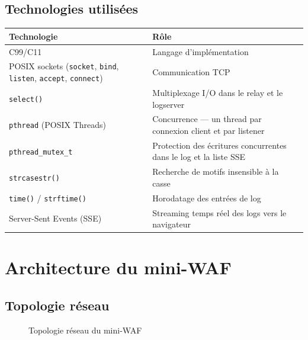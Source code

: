 \documentclass[12pt,a4paper]{article}
\begin{document}
\subsection{Technologies utilisées}

\begin{tabularx}{\linewidth}{lX}
  \toprule
  \textbf{Technologie} & \textbf{Rôle} \\
  \midrule
  C99/C11 & Langage d'implémentation \\
  POSIX sockets (\texttt{socket}, \texttt{bind}, \texttt{listen}, \texttt{accept}, \texttt{connect}) & Communication TCP \\
  \texttt{select()} & Multiplexage I/O dans le relay et le logserver \\
  \texttt{pthread} (POSIX Threads) & Concurrence --- un thread par connexion client et par listener \\
  \texttt{pthread\_mutex\_t} & Protection des écritures concurrentes dans le log et la liste SSE \\
  \texttt{strcasestr()} & Recherche de motifs insensible à la casse \\
  \texttt{time()} / \texttt{strftime()} & Horodatage des entrées de log \\
  Server-Sent Events (SSE) & Streaming temps réel des logs vers le navigateur \\
  \bottomrule
\end{tabularx}

\section{Architecture du mini-WAF}

\subsection{Topologie réseau}

\begin{figure}[H]
\centering
{}
\caption{Topologie réseau du mini-WAF}
\end{figure}
\end{document}
